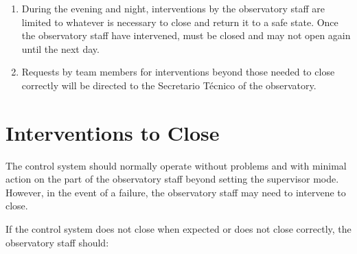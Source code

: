 \begin{enumerate}
\begin{enumerate}
\item
When the control system closes (at the end of the night, in response to weather conditions, or if the supervisor is forced to close), it switches the lights on for safety. At the end of the process, if the control system can determine that the enclosure closed correctly, it will switch the lights off. If it cannot, it will leave the lights switched on. Thus, if the lights are left on, this indicates that there was a problem during closing and the observatory staff should intervene as described in \S\ref{section:operations:interventions}.

\item
The observatory staff should report explicit changes to the supervisor state (e.g., use of the “Enable” and “Close” buttons) and any other relevant information in the Google chat.
\end{enumerate}

As their other duties permit, the observatory staff are encouraged to report other conditions or occurrences that might degrade the ability of the telescope to observe (e.g., failures of the control system or failures to focus) in the Google chat.

\item
During the evening and night, interventions by the observatory staff are limited to whatever is necessary to close {\projectname} and return it to a safe state. Once the observatory staff have intervened, {\projectname} must be closed and may not open again until the next day.

\item
Requests by team members for interventions beyond those needed to close {\projectname} correctly will be directed to the Secretario Técnico of the observatory.
\end{enumerate}

\section{Interventions to Close}
\label{section:operations:interventions}

The control system should normally operate without problems and with minimal action on the part of the observatory staff beyond setting the supervisor mode. However, in the event of a failure, the observatory staff may need to intervene to close.

If the control system does not close when expected or does not close correctly, the observatory staff should:

